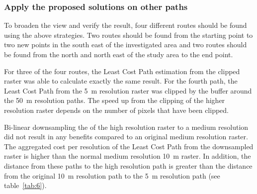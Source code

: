 
\subsubsection{Apply the proposed solutions on other paths}
To broaden the view and verify the result, four different routes should be found using the above strategies.
Two routes should be found from the starting point to two new points in the south east of the investigated area and two routes should be found from the north and north east of the study area to the end point.

For three of the four routes, the Least Cost Path estimation from the clipped raster was able to calculate exactly the same result.
For the fourth path, the Least Cost Path from the 5~m resolution raster was clipped by the buffer around the 50~m resolution paths.
The speed up from the clipping of the higher resolution raster depends on the number of pixels that have been clipped. 

Bi-linear downsampling the of the high resolution raster to a medium resolution did not result in any benefits compared to an original medium resolution raster.
The aggregated cost per resolution of the Least Cost Path from the downsampled raster is higher than the normal medium resolution 10~m raster.
In addition, the distance from these paths to the high resolution path  is greater than the distance from the original 10~m resolution path to the 5~m resolution path (see table~\ref{tab:6}).


